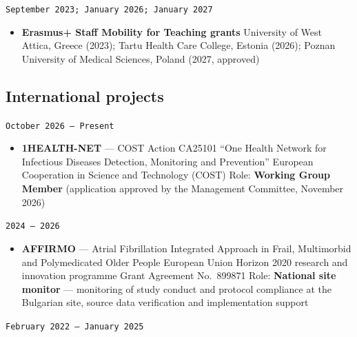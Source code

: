 \documentclass[
  10.5pt,
  a4paper,
  DIV=11,
  numbers=noendperiod]{scrartcl}
\providecommand{\tightlist}{%
  \setlength{\itemsep}{0pt}\setlength{\parskip}{0pt}}
\let\oldtexttt\texttt
\renewcommand{\texttt}[1]{{\color{cvbronze}\small\oldtexttt{#1}}}
\begin{document}
\texttt{September\ 2023;\ January\ 2026;\ January\ 2027}

\begin{itemize}
\tightlist
\item
  \textbf{Erasmus+ Staff Mobility for Teaching grants} \textbar{}
  University of West Attica, Greece (2023); Tartu Health Care College,
  Estonia (2026); Poznan University of Medical Sciences, Poland (2027,
  approved)
\end{itemize}

\subsection{International projects}\label{international-projects}

\texttt{October\ 2026\ –\ Present}

\begin{itemize}
\tightlist
\item
  \textbf{1HEALTH-NET} --- COST Action CA25101 ``One Health Network for
  Infectious Diseases Detection, Monitoring and Prevention'' \textbar{}
  European Cooperation in Science and Technology (COST) \textbar{} Role:
  \textbf{Working Group Member} (application approved by the Management
  Committee, November 2026)
\end{itemize}

\texttt{2024\ –\ 2026}

\begin{itemize}
\tightlist
\item
  \textbf{AFFIRMO} --- Atrial Fibrillation Integrated Approach in Frail,
  Multimorbid and Polymedicated Older People \textbar{} European Union
  Horizon 2020 research and innovation programme \textbar{} Grant
  Agreement No.~899871 \textbar{} Role: \textbf{National site monitor}
  --- monitoring of study conduct and protocol compliance at the
  Bulgarian site, source data verification and implementation support
\end{itemize}

\texttt{February\ 2022\ –\ January\ 2025}
\end{document}
